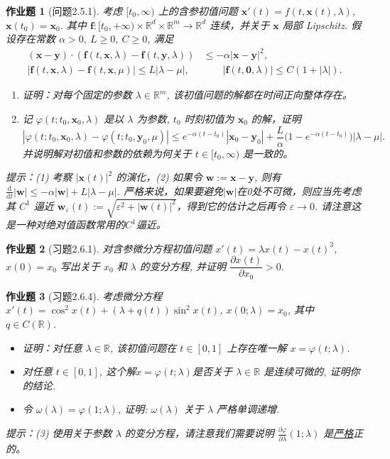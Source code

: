 \documentclass[UTF8,fontset=windows,12pt]{ctexart}
\theoremstyle{kaiti-theorem}
\newtheorem{problem}{作业题}
\numberwithin{equation}{section}
\newcommand{\R}{\mathbb{R}}
\newcommand{\bds}[1]{\boldsymbol{#1}}  %
\newcommand{\vp}{\varphi}
\newcommand{\p}{\partial}
\newcommand{\lam}{\lambda}
\newcommand{\ddt}{\frac{\mathrm{d}}{\mathrm{d}t}}
\newcommand{\eps}{\varepsilon}
\newcommand{\xx}{{\bds{x}}}
\newcommand{\ww}{\mathbf{w}}
\newcommand{\yy}{{\bds{y}}}
\newcommand{\zo}{\mathbf{0}}
\newcommand{\ff}{\bds{f}}
\begin{document}
\begin{problem}[问题2.5.1]
考虑 $[t_0,\infty)$ 上的含参初值问题 $\xx'(t)=f(t,\xx(t), \lam)$, $\xx(t_0)=\xx_0$. 其中 $\ff: [t_0,+\infty)\times\R^d\times\R^m\to \R^d$ 连续，并关于 $\xx$ 局部 Lipschitz.  假设存在常数
\(\alpha>0,~L\geqslant0,~C\geqslant0\), 满足
\begin{align*}
(\xx-\yy)\cdot(\ff(t,\xx,\lam)-\ff(t,\yy,\lam))&\leqslant -\alpha|\xx-\yy|^2,\\
 |\ff(t,\xx,\lam)-\ff(t,\xx,\mu)|\leqslant L|\lam-\mu|,&\qquad |\ff(t,\zo,\lam)| \leqslant C(1+|\lam|).
\end{align*}
\begin{enumerate}
 \item [(1)] 证明：对每个固定的参数 $\lam\in\R^m$, 该初值问题的解都在时间正向整体存在。
 \item [(2)] 记 $\varphi(t;t_0,\xx_0,\lam)$ 是以 $\lam$ 为参数, $t_0$ 时刻初值为 $\xx_0$ 的解，证明
 \[
  |\varphi(t;t_0,\xx_0,\lam)- \varphi(t;t_0,\yy_0,\mu)|\leqslant e^{-\alpha(t-t_0)}|\xx_0-\yy_0|+ \frac{L}{\alpha}\bigl(1- e^{-\alpha(t-t_0)}\bigr) |\lam-\mu|.
 \] 并说明解对初值和参数的依赖为何关于 $t\in[t_0,\infty)$ 是一致的。
\end{enumerate}

提示：(1) 考察 $|\xx(t)|^2$ 的演化，(2)  如果令 $\ww:=\xx-\yy$, 则有 $\ddt|\ww|\leqslant -\alpha|\ww|+L|\lam-\mu|$. 严格来说，如果要避免$|\ww|$在0处不可微，则应当先考虑其 $C^1$ 逼近 $\ww_\eps(t):=\sqrt{\eps^2+|\ww(t)|^2}$，得到它的估计之后再令 $\eps\to 0$.  请注意这是一种对绝对值函数常用的$C^1$逼近。
\end{problem}

\begin{problem}[习题2.6.1]
对含参微分方程初值问题 $x'(t)=\lam x(t)-x(t)^3$, $x(0)=x_0$ 写出关于 $x_0$ 和 $\lam$ 的变分方程, 并证明 $\dfrac{\p x(t)}{\p x_0}>0.$
\end{problem}




\begin{problem}[习题2.6.4]
考虑微分方程 $x'(t)=\cos^2x(t) + (\lam+q(t))\sin^2 x(t)$, $x(0;\lam)=x_0$, 其中 $q\in C(\R)$.
\begin{itemize}
\item [(1)] 证明：对任意 $\lam\in\R$, 该初值问题在 $t\in[0,1]$ 上存在唯一解 $x=\vp(t;\lam)$.
\item [(2)] 对任意 $t\in[0,1]$, 这个解$x=\vp(t;\lam)$是否关于 $\lam\in\R$ 是连续可微的, 证明你的结论.
\item [(3)] 令 $\omega(\lam)=\vp(1;\lam)$, 证明: $\omega(\lam)$ 关于 $\lam$ 严格单调递增.
\end{itemize}

提示：(3) 使用关于参数 $\lam$ 的变分方程，请注意我们需要说明 $\frac{\p\vp}{\p\lam}(1;\lam)$ 是\underline{严格}正的。
\end{problem}
\end{document}
